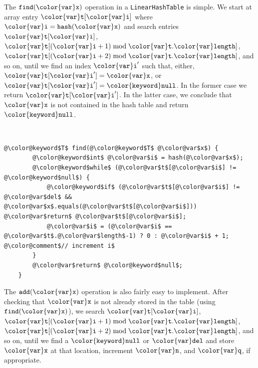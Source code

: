 \documentclass[10pt]{book}
\theoremstyle{plain}
\theoremstyle{definition}
\begin{document}
The \ensuremath{\mathtt{find({\color{var}x})}} operation in a \texttt{LinearHashTable} is simple.  We start
at array entry \ensuremath{\mathtt{{\color{var}t}[{\color{var}i}]}} where $\ensuremath{\mathtt{{\color{var}i}}}=\ensuremath{\mathtt{hash({\color{var}x})}}$ and search entries \ensuremath{\mathtt{{\color{var}t}[{\color{var}i}]}},
$\ensuremath{\mathtt{{\color{var}t}}}[(\ensuremath{\mathtt{{\color{var}i}}}+1)\bmod \ensuremath{\mathtt{{\color{var}t}.{\color{var}length}}}]$, $\ensuremath{\mathtt{{\color{var}t}}}[(\ensuremath{\mathtt{{\color{var}i}}}+2)\bmod \ensuremath{\mathtt{{\color{var}t}.{\color{var}length}}}]$, and so on,
until we find an index \ensuremath{\mathtt{{\color{var}i}'}} such that, either, \ensuremath{\mathtt{{\color{var}t}[{\color{var}i}']={\color{var}x}}}, or \ensuremath{\mathtt{{\color{var}t}[{\color{var}i}']={\color{keyword}null}}}.
In the former case we return \ensuremath{\mathtt{{\color{var}t}[{\color{var}i}']}}. In the latter case, we conclude
that \ensuremath{\mathtt{{\color{var}x}}} is not contained in the hash table and return \ensuremath{\mathtt{{\color{keyword}null}}}.


 \ \vspace{.5ex}\begin{Verbatim}[gobble=1,tabsize=2,frame=single,framerule=1.2pt,commandchars=\\@\$,label=\texttt{LinearHashTable},labelposition=topline]
	@\color@keyword$T$ find(@\color@keyword$T$ @\color@var$x$) {
		@\color@keyword$int$ @\color@var$i$ = hash(@\color@var$x$);
		@\color@keyword$while$ (@\color@var$t$[@\color@var$i$] != @\color@keyword$null$) {
			@\color@keyword$if$ (@\color@var$t$[@\color@var$i$] != @\color@var$del$ && @\color@var$x$.equals(@\color@var$t$[@\color@var$i$])) @\color@var$return$ @\color@var$t$[@\color@var$i$];
			@\color@var$i$ = (@\color@var$i$ == @\color@var$t$.@\color@var$length$-1) ? 0 : @\color@var$i$ + 1; @\color@comment$// increment i$
		}
		@\color@var$return$ @\color@keyword$null$;
	}
\end{Verbatim}


The \ensuremath{\mathtt{add({\color{var}x})}} operation is also fairly easy to implement. After checking
that \ensuremath{\mathtt{{\color{var}x}}} is not already stored in the table (using \ensuremath{\mathtt{find({\color{var}x})}}), we search
\ensuremath{\mathtt{{\color{var}t}[{\color{var}i}]}}, $\ensuremath{\mathtt{{\color{var}t}}}[(\ensuremath{\mathtt{{\color{var}i}}}+1)\bmod \ensuremath{\mathtt{{\color{var}t}.{\color{var}length}}}]$, $\ensuremath{\mathtt{{\color{var}t}}}[(\ensuremath{\mathtt{{\color{var}i}}}+2)\bmod \ensuremath{\mathtt{{\color{var}t}.{\color{var}length}}}]$,
and so on, until we find a \ensuremath{\mathtt{{\color{keyword}null}}} or \ensuremath{\mathtt{{\color{var}del}}} and store \ensuremath{\mathtt{{\color{var}x}}} at that location,
increment \ensuremath{\mathtt{{\color{var}n}}}, and \ensuremath{\mathtt{{\color{var}q}}}, if appropriate.
\end{document}
